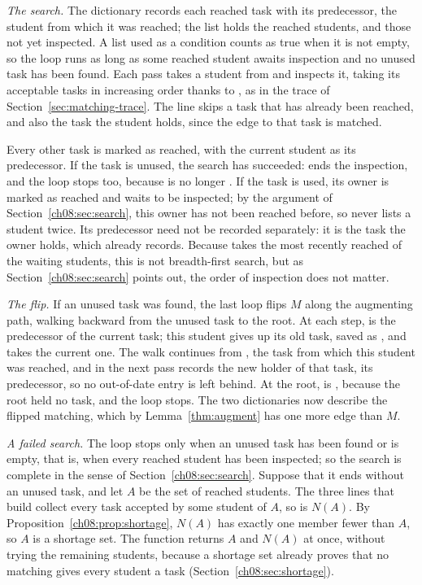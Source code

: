 \emph{The search.} The dictionary  records each reached task with its predecessor, the student from which it was reached; the list  holds the reached students, and  those not yet inspected. A list used as a condition counts as true when it is not empty, so the  loop runs as long as some reached student awaits inspection and no unused task has been found. Each pass takes a student from  and inspects it, taking its acceptable tasks in increasing order thanks to , as in the trace of Section~\ref{sec:matching-trace}. The  line skips a task that has already been reached, and also the task the student holds, since the edge to that task is matched.

Every other task is marked as reached, with the current student as its predecessor. If the task is unused, the search has succeeded:  ends the inspection, and the  loop stops too, because  is no longer . If the task is used, its owner is marked as reached and waits to be inspected; by the argument of Section~\ref{ch08:sec:search}, this owner has not been reached before, so  never lists a student twice. Its predecessor need not be recorded separately: it is the task the owner holds, which  already records. Because  takes the most recently reached of the waiting students, this is not breadth-first search, but as Section~\ref{ch08:sec:search} points out, the order of inspection does not matter.

\emph{The flip.} If an unused task was found, the last loop flips $M$ along the augmenting path, walking backward from the unused task to the root. At each step,  is the predecessor of the current task; this student gives up its old task, saved as , and takes the current one. The walk continues from , the task from which this student was reached, and in the next pass  records the new holder of that task, its predecessor, so no out-of-date entry is left behind. At the root,  is , because the root held no task, and the loop stops. The two dictionaries now describe the flipped matching, which by Lemma~\ref{thm:augment} has one more edge than $M$.

\emph{A failed search.} The  loop stops only when an unused task has been found or  is empty, that is, when every reached student has been inspected; so the search is complete in the sense of Section~\ref{ch08:sec:search}. Suppose that it ends without an unused task, and let $A$ be the set of reached students. The three lines that build  collect every task accepted by some student of $A$, so  is $N(A)$. By Proposition~\ref{ch08:prop:shortage}, $N(A)$ has exactly one member fewer than $A$, so $A$ is a shortage set. The function returns $A$ and $N(A)$ at once, without trying the remaining students, because a shortage set already proves that no matching gives every student a task (Section~\ref{ch08:sec:shortage}).

